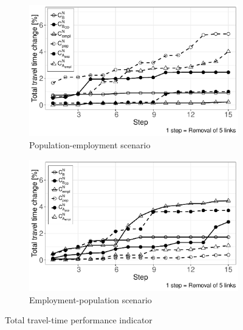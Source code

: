 \documentclass[]{elsarticle} %
\begin{document}
\begin{figure}[!ht]
\centering
    \begin{subfigure}{.7\textwidth}
        \centering
        \includegraphics[width=1\linewidth]{Plots/travel_time_diff_5.pdf}  
        \caption{Population-employment scenario}
        \label{tt-diff5a}
    \end{subfigure}
    \begin{subfigure}{.7\textwidth}
        \centering
        \includegraphics[width=1\linewidth]{Plots/travel_time_diff_5_emp.pdf}  
        \caption{Employment-population scenario}
        \label{tt-diff5b}
    \end{subfigure}
    \caption{Total travel-time performance indicator}
    \label{tt-diff5}
\end{figure}
\end{document}
